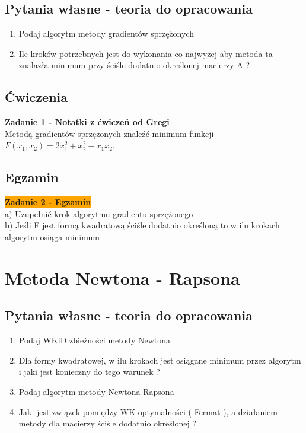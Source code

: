 \documentclass[a4paper,11pt]{article}
\begin{document}
\subsection{Pytania własne - teoria do opracowania}

\begin{enumerate}
\item Podaj algorytm metody gradientów sprzężonych
\item Ile kroków potrzebnych jest do wykonania co najwyżej aby metoda ta znalazła minimum przy ściśle dodatnio określonej macierzy A ?
\end{enumerate}

\subsection{Ćwiczenia}

\begin{framed}
\textbf{Zadanie 1 - Notatki z ćwiczeń od Gregi} \\
Metodą gradientów sprzężonych znaleźć minimum funkcji \( F(x_1,x_2)=2x_1^2+x_2^2-x_1x_2 \).
\end{framed}

\subsection{Egzamin}
\begin{framed}
\textbf{\colorbox{orange}{Zadanie 2 - Egzamin}} \\
a) Uzupełnić krok algorytmu gradientu sprzężonego \\
b) Jeśli F jest formą kwadratową ściśle dodatnio określoną to w ilu krokach algorytm osiąga minimum  
\end{framed}










\newpage
\section{Metoda Newtona - Rapsona}

\subsection{Pytania własne - teoria do opracowania}

\begin{enumerate}

\item Podaj WKiD zbieżności metody Newtona 
\item Dla formy kwadratowej, w ilu krokach jest osiągane minimum przez algorytm i jaki jest konieczny do tego warunek ?
\item Podaj algorytm metody Newtona-Rapsona
\item Jaki jest związek pomiędzy WK optymalności ( Fermat ), a działaniem metody dla macierzy ściśle dodatnio określonej ?
\end{enumerate}
\end{document}
